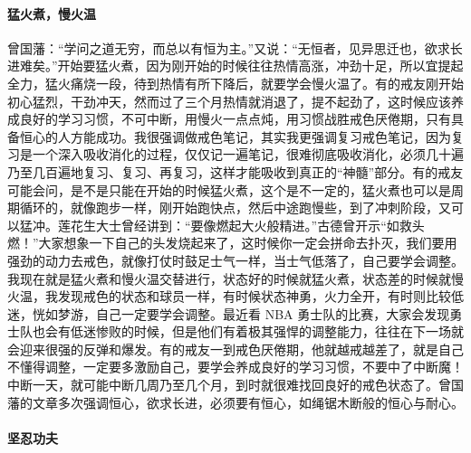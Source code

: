 \paragraph{猛火煮，慢火温}

曾国藩：“学问之道无穷，而总以有恒为主。”又说：“无恒者，见异思迁也，欲求长进难矣。”开始要猛火煮，因为刚开始的时候往往热情高涨，冲劲十足，所以宜提起全力，猛火痛烧一段，待到热情有所下降后，就要学会慢火温了。有的戒友刚开始初心猛烈，干劲冲天，然而过了三个月热情就消退了，提不起劲了，这时候应该养成良好的学习习惯，不可中断，用慢火一点点炖，用习惯战胜戒色厌倦期，只有具备恒心的人方能成功。我很强调做戒色笔记，其实我更强调复习戒色笔记，因为复习是一个深入吸收消化的过程，仅仅记一遍笔记，很难彻底吸收消化，必须几十遍乃至几百遍地复习、复习、再复习，这样才能吸收到真正的“神髓”部分。有的戒友可能会问，是不是只能在开始的时候猛火煮，这个是不一定的，猛火煮也可以是周期循环的，就像跑步一样，刚开始跑快点，然后中途跑慢些，到了冲刺阶段，又可以猛冲。莲花生大士曾经讲到：“要像燃起大火般精进。”古德曾开示“如救头燃！”大家想象一下自己的头发烧起来了，这时候你一定会拼命去扑灭，我们要用强劲的动力去戒色，就像打仗时鼓足士气一样，当士气低落了，自己要学会调整。我现在就是猛火煮和慢火温交替进行，状态好的时候就猛火煮，状态差的时候就慢火温，我发现戒色的状态和球员一样，有时候状态神勇，火力全开，有时则比较低迷，恍如梦游，自己一定要学会调整。最近看 NBA 勇士队的比赛，大家会发现勇士队也会有低迷惨败的时候，但是他们有着极其强悍的调整能力，往往在下一场就会迎来很强的反弹和爆发。有的戒友一到戒色厌倦期，他就越戒越差了，就是自己不懂得调整，一定要多激励自己，要学会养成良好的学习习惯，不要中了中断魔！中断一天，就可能中断几周乃至几个月，到时就很难找回良好的戒色状态了。曾国藩的文章多次强调恒心，欲求长进，必须要有恒心，如绳锯木断般的恒心与耐心。

\paragraph{坚忍功夫}


